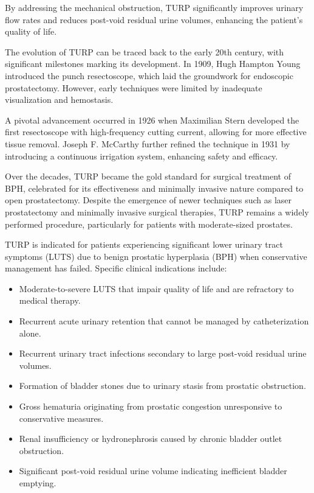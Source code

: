 By addressing the mechanical obstruction, TURP significantly improves urinary flow rates and reduces post-void residual urine volumes, enhancing the patient's quality of life.

The evolution of TURP can be traced back to the early 20th century, with significant milestones marking its development. In 1909, Hugh Hampton Young introduced the punch resectoscope, which laid the groundwork for endoscopic prostatectomy. However, early techniques were limited by inadequate visualization and hemostasis.

A pivotal advancement occurred in 1926 when Maximilian Stern developed the first resectoscope with high-frequency cutting current, allowing for more effective tissue removal. Joseph F. McCarthy further refined the technique in 1931 by introducing a continuous irrigation system, enhancing safety and efficacy.

Over the decades, TURP became the gold standard for surgical treatment of BPH, celebrated for its effectiveness and minimally invasive nature compared to open prostatectomy. Despite the emergence of newer techniques such as laser prostatectomy and minimally invasive surgical therapies, TURP remains a widely performed procedure, particularly for patients with moderate-sized prostates.

TURP is indicated for patients experiencing significant lower urinary tract symptoms (LUTS) due to benign prostatic hyperplasia (BPH) when conservative management has failed. Specific clinical indications include:

\begin{itemize}
  \item Moderate-to-severe LUTS that impair quality of life and are refractory to medical therapy.
  \item Recurrent acute urinary retention that cannot be managed by catheterization alone.
  \item Recurrent urinary tract infections secondary to large post-void residual urine volumes.
  \item Formation of bladder stones due to urinary stasis from prostatic obstruction.
  \item Gross hematuria originating from prostatic congestion unresponsive to conservative measures.
  \item Renal insufficiency or hydronephrosis caused by chronic bladder outlet obstruction.
  \item Significant post-void residual urine volume indicating inefficient bladder emptying.
\end{itemize}

